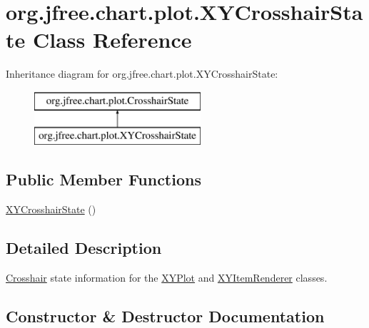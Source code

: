 \hypertarget{classorg_1_1jfree_1_1chart_1_1plot_1_1_x_y_crosshair_state}{}\section{org.\+jfree.\+chart.\+plot.\+X\+Y\+Crosshair\+State Class Reference}
\label{classorg_1_1jfree_1_1chart_1_1plot_1_1_x_y_crosshair_state}
Inheritance diagram for org.\+jfree.\+chart.\+plot.\+X\+Y\+Crosshair\+State\+:\begin{figure}[H]
\begin{center}
\leavevmode
\includegraphics[height=2.000000cm]{classorg_1_1jfree_1_1chart_1_1plot_1_1_x_y_crosshair_state}
\end{center}
\end{figure}
\subsection*{Public Member Functions}
\begin{DoxyCompactItemize}
\item 
\mbox{\hyperlink{classorg_1_1jfree_1_1chart_1_1plot_1_1_x_y_crosshair_state_acd42224e0d53b13503a8ce8c2f45a04e}{X\+Y\+Crosshair\+State}} ()
\end{DoxyCompactItemize}


\subsection{Detailed Description}
\mbox{\hyperlink{classorg_1_1jfree_1_1chart_1_1plot_1_1_crosshair}{Crosshair}} state information for the \mbox{\hyperlink{classorg_1_1jfree_1_1chart_1_1plot_1_1_x_y_plot}{X\+Y\+Plot}} and \mbox{\hyperlink{}{X\+Y\+Item\+Renderer}} classes. 

\subsection{Constructor \& Destructor Documentation}
\mbox{\label{classorg_1_1jfree_1_1chart_1_1plot_1_1_x_y_crosshair_state_acd42224e0d53b13503a8ce8c2f45a04e}} 
